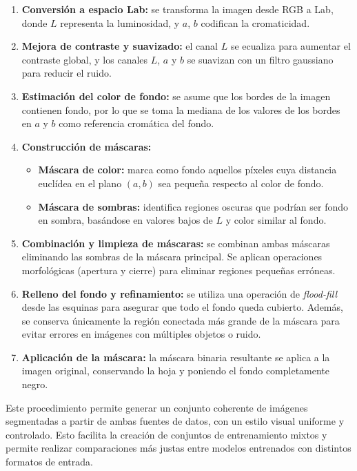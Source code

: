 \documentclass[11pt,spanish,listoffigures,listoftables]{tfgetsinf}
\begin{document}
\begin{enumerate}
    \item \textbf{Conversión a espacio Lab:} se transforma la imagen desde RGB a Lab, donde $L$ representa la luminosidad, y $a$, $b$ codifican la cromaticidad.
    
    \item \textbf{Mejora de contraste y suavizado:} el canal $L$ se ecualiza para aumentar el contraste global, y los canales $L$, $a$ y $b$ se suavizan con un filtro gaussiano para reducir el ruido.

    \item \textbf{Estimación del color de fondo:} se asume que los bordes de la imagen contienen fondo, por lo que se toma la mediana de los valores de los bordes en $a$ y $b$ como referencia cromática del fondo.

    \item \textbf{Construcción de máscaras:}
    \begin{itemize}
        \item \textbf{Máscara de color:} marca como fondo aquellos píxeles cuya distancia euclídea en el plano $(a,b)$ sea pequeña respecto al color de fondo.
        \item \textbf{Máscara de sombras:} identifica regiones oscuras que podrían ser fondo en sombra, basándose en valores bajos de $L$ y color similar al fondo.
    \end{itemize}

    \item \textbf{Combinación y limpieza de máscaras:} se combinan ambas máscaras eliminando las sombras de la máscara principal. Se aplican operaciones morfológicas (apertura y cierre) para eliminar regiones pequeñas erróneas.

    \item \textbf{Relleno del fondo y refinamiento:} se utiliza una operación de \textit{flood-fill} desde las esquinas para asegurar que todo el fondo queda cubierto. Además, se conserva únicamente la región conectada más grande de la máscara para evitar errores en imágenes con múltiples objetos o ruido.

    \item \textbf{Aplicación de la máscara:} la máscara binaria resultante se aplica a la imagen original, conservando la hoja y poniendo el fondo completamente negro.
\end{enumerate}

Este procedimiento permite generar un conjunto coherente de imágenes segmentadas a partir de ambas fuentes de datos, con un estilo visual uniforme y controlado. Esto facilita la creación de conjuntos de entrenamiento mixtos y permite realizar comparaciones más justas entre modelos entrenados con distintos formatos de entrada.
\end{document}
